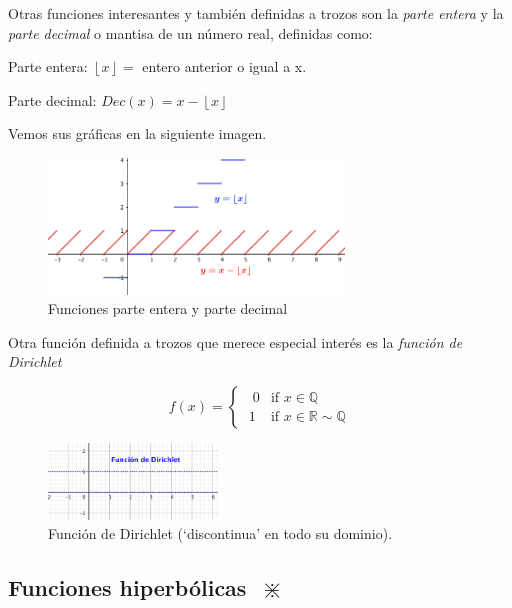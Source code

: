 		 Otras funciones interesantes y también definidas a trozos son la \emph{parte entera} y la \emph{parte decimal} o mantisa de un número real, definidas como:
		 
		 Parte entera: $\left\lfloor x \right\rfloor = $ entero anterior o igual a x.
		 
		 Parte decimal: $Dec(x)=x-\left\lfloor x \right\rfloor$
		 
		 Vemos sus gráficas en la siguiente imagen.
		 
		\begin{figure}[H]
			\centering
			\includegraphics[width=0.7\textwidth]{imagenes/imagenes02/T02IM12.png}
			\caption{Funciones parte entera y parte decimal}
		\end{figure}
		
		 \begin{multicols}{2}
		 Otra función definida a trozos que merece especial interés es la \emph{función de Dirichlet}
		
		\begin{equation*}
		f(x)=
		\begin{cases} 
		\;\;  0 &\mbox{if } x \in \mathbb{Q} \\ 
		\; 1 & \mbox{if } x \in \mathbb{R} \sim \mathbb{Q} 
		\end{cases}
		\end{equation*}
		
		\begin{figure}[H]
			\centering
			\includegraphics[width=0.4\textwidth]{imagenes/imagenes02/T02IM13.png}
			\caption{Función de Dirichlet (`discontinua' en todo su dominio).}
			\label{fig:dirichlet}
		\end{figure}
		\end{multicols}
		
		\subsection{Funciones hiperbólicas $\; \divideontimes$ }
		\label{subsec:func-hiperb}
		

